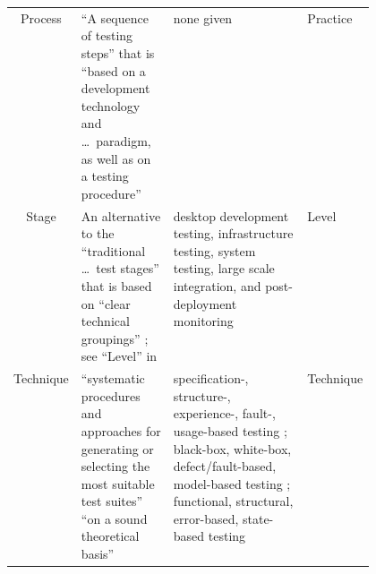 \begin{table}[hbtp!]
\begin{tabularx}{\linewidth}{|c|X|m{0.37\linewidth}|m{0.1\linewidth}|}
        Process                            & ``A sequence of
        testing steps'' \citep[p.~2]{BarbosaEtAl2006} that
        is ``based on a development technology and \dots\
        paradigm, as well as on a testing procedure''
        \citep[p.~3]{BarbosaEtAl2006}      & none given         & Practice                               \\
        Stage                              & An
        alternative to the ``traditional \dots\ test stages'' that is based on
        ``clear technical groupings'' \citep[p.~13]{Gerrard2000a}; see ``Level'' in
        \nameref{tab:ieeeTestTerms}        & desktop
        development testing, infrastructure testing, system testing,
        large scale integration, and post-deployment monitoring
        \citep[p.~13]{Gerrard2000a}        & Level                                                       \\
        Technique                          & ``systematic
        procedures and approaches for generating or selecting the most suitable test
        suites'' \citep[p.~5-10]{SWEBOK2024} ``on a sound theoretical basis''
        \citep[p.~3]{BarbosaEtAl2006}      & specification-,
        structure-, experience-, fault-, usage-based testing \citep[pp.~5-10, 5-13 to 5-15]{SWEBOK2024};
        black-box, white-box, defect/fault-based, model-based testing \citep[p.~3]{SouzaEtAl2017};
        functional, structural, error-based, state-based testing
        \citep[p.~3]{BarbosaEtAl2006}
                                           & Technique                                                   \\
        \hline
    \end{tabularx}
\end{table}

